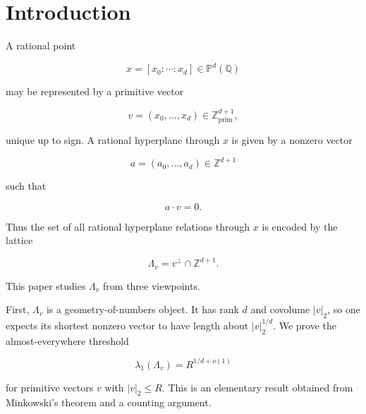 \documentclass[11pt]{article}
\begin{document}
\begin{abstract}
If

\[
\lambda_1(\Lambda_v)\le t|v|_2^{1/d}
\]

for $t\in\mathbb Q_{>0}$, then at continuity points of the limiting distribution,

\[
\delta(v;R)\ge -\log_2F_d(t)-K(t)-O_d(1)-o_R(1),
\]

where $F_d(t)$ is the Haar probability that a unimodular $d$-lattice has a nonzero vector of length at most $t$. For $d\ge2$,

\[
F_d(t)\sim \frac{\operatorname{vol}(B_d)}{2\zeta(d)}t^d
\qquad(t\downarrow0),
\]

so an anomalously short relation forces approximately $d\log_2(1/t)$ bits of Kolmogorov deficiency, up to the cost of describing $t$. We also record the corresponding Bezout-certificate consequence of the Horesh-Karasik shortest-solution theorem.

\end{abstract}

\section{Introduction}

A rational point

\[
x=[x_0:\cdots:x_d]\in\mathbb P^d(\mathbb Q)
\]

may be represented by a primitive vector

\[
v=(x_0,\dots,x_d)\in\mathbb Z^{d+1}_{\mathrm{prim}},
\]

unique up to sign. A rational hyperplane through $x$ is given by a nonzero vector

\[
a=(a_0,\dots,a_d)\in\mathbb Z^{d+1}
\]

such that

\[
a\cdot v=0.
\]

Thus the set of all rational hyperplane relations through $x$ is encoded by the lattice

\[
\Lambda_v=v^\perp\cap\mathbb Z^{d+1}.
\]

This paper studies $\Lambda_v$ from three viewpoints.

First, $\Lambda_v$ is a geometry-of-numbers object. It has rank $d$ and covolume $|v|_2$, so one expects its shortest nonzero vector to have length about $|v|_2^{1/d}$. We prove the almost-everywhere threshold

\[
\lambda_1(\Lambda_v)=R^{1/d+o(1)}
\]

for primitive vectors $v$ with $|v|_2\le R$. This is an elementary result obtained from Minkowski's theorem and a counting argument.
\end{document}
